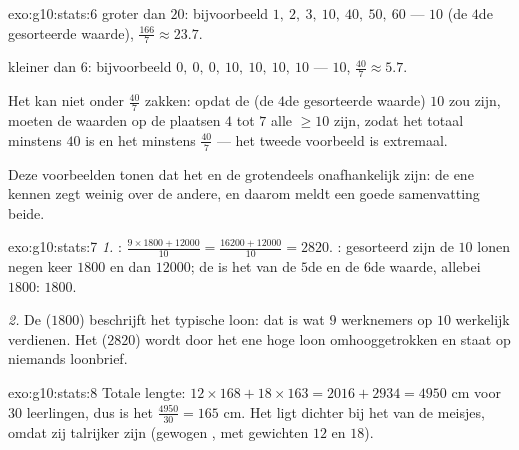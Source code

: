 \begin{solution}{exo:g10:stats:6}
 groter dan $20$: bijvoorbeeld $1,\ 2,\ 3,\ 10,\ 40,\ 50,\ 60$ ---
 $10$ (de $4$de gesorteerde waarde), 
$\frac{166}{7} \approx 23.7$.

 kleiner dan $6$: bijvoorbeeld $0,\ 0,\ 0,\ 10,\ 10,\ 10,\ 10$ ---
 $10$,  $\frac{40}{7} \approx 5.7$.

Het  kan niet onder $\frac{40}{7}$ zakken: opdat de  (de
$4$de gesorteerde waarde) $10$ zou zijn, moeten de waarden op de plaatsen
$4$ tot $7$ alle $\geq 10$ zijn, zodat het totaal minstens $40$ is en het
 minstens $\frac{40}{7}$ --- het tweede voorbeeld is extremaal.

Deze voorbeelden tonen dat het  en de  grotendeels
onafhankelijk zijn: de ene kennen zegt weinig over de andere, en daarom
meldt een goede samenvatting beide.
\end{solution}

\begin{solution}{exo:g10:stats:7}
\emph{1.} :
$\frac{9 \times 1800 + 12000}{10} = \frac{16200 + 12000}{10} = 2820$.
: gesorteerd zijn de $10$ lonen negen keer $1800$ en dan $12000$; de
 is het  van de $5$de en de $6$de waarde, allebei $1800$:
 $1800$.

\emph{2.} De  ($1800$) beschrijft het typische loon: dat is wat $9$
werknemers op $10$ werkelijk verdienen. Het  ($2820$) wordt door
het ene hoge loon omhooggetrokken en staat op niemands loonbrief.
\end{solution}

\begin{solution}{exo:g10:stats:8}
Totale lengte: $12 \times 168 + 18 \times 163 = 2016 + 2934 = 4950$ cm voor
$30$ leerlingen, dus is het  $\frac{4950}{30} = 165$ cm. Het ligt
dichter bij het  van de meisjes, omdat zij talrijker zijn (gewogen
, met gewichten $12$ en $18$).
\end{solution}

